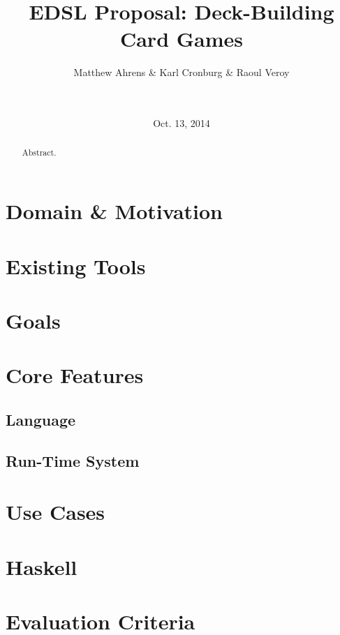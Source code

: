 \documentclass{acm_proc_article-sp}
\begin{document}
\title{EDSL Proposal: Deck-Building Card Games}

\author{
  \alignauthor
  Matthew Ahrens \& Karl Cronburg \& Raoul Veroy \\
   \\
         \\
}
\date{Oct. 13, 2014}

\maketitle

\begin{abstract}
Abstract.
\end{abstract}

\section{Domain \& Motivation}

\section{Existing Tools}

\section{Goals}

\section{Core Features}
\subsection{Language}

\subsection{Run-Time System}

\section{Use Cases}

\section{Haskell}

\section{Evaluation Criteria}

\begin{biblist}
\end{biblist}

\end{document}
